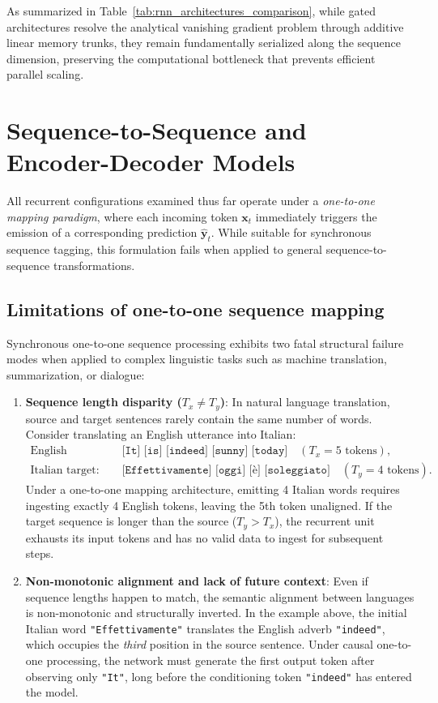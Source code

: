 \documentclass[../../main.tex]{subfiles}
\begin{document}
As summarized in Table~\ref{tab:rnn_architectures_comparison}, while gated architectures resolve the analytical vanishing gradient problem through additive linear memory trunks, they remain fundamentally serialized along the sequence dimension, preserving the computational bottleneck that prevents efficient parallel scaling.

\clearpage
\section{Sequence-to-Sequence and Encoder-Decoder Models}
\label{sec:rnn_seq2seq_bottleneck}

All recurrent configurations examined thus far operate under a \textit{one-to-one mapping paradigm}, where each incoming token $\mathbf{x}_t$ immediately triggers the emission of a corresponding prediction $\hat{\mathbf{y}}_t$. While suitable for synchronous sequence tagging, this formulation fails when applied to general sequence-to-sequence transformations.

\subsection{Limitations of one-to-one sequence mapping}
\label{subsec:rnn_limitations_one_to_one}

Synchronous one-to-one sequence processing exhibits two fatal structural failure modes when applied to complex linguistic tasks such as machine translation, summarization, or dialogue:
\begin{enumerate}
    \item \textbf{Sequence length disparity ($T_x \neq T_y$)}: In natural language translation, source and target sentences rarely contain the same number of words. Consider translating an English utterance into Italian:
    \begin{align}
    \text{English source: } & \quad \texttt{[It] [is] [indeed] [sunny] [today]} \quad (T_x = 5 \text{ tokens}), \\
    \text{Italian target: } & \quad \texttt{[Effettivamente] [oggi] [è] [soleggiato]} \quad (T_y = 4 \text{ tokens}).
    \end{align}
    Under a one-to-one mapping architecture, emitting 4 Italian words requires ingesting exactly 4 English tokens, leaving the 5th token unaligned. If the target sequence is longer than the source ($T_y > T_x$), the recurrent unit exhausts its input tokens and has no valid data to ingest for subsequent steps.
    
    \item \textbf{Non-monotonic alignment and lack of future context}: Even if sequence lengths happen to match, the semantic alignment between languages is non-monotonic and structurally inverted. In the example above, the initial Italian word \texttt{"Effettivamente"} translates the English adverb \texttt{"indeed"}, which occupies the \textit{third} position in the source sentence. Under causal one-to-one processing, the network must generate the first output token after observing only \texttt{"It"}, long before the conditioning token \texttt{"indeed"} has entered the model.
\end{enumerate}
\end{document}
